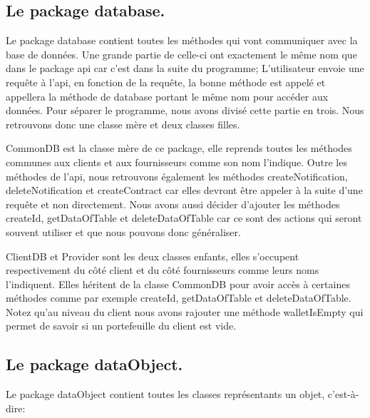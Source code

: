 \subsection{Le package database.}

\begin{flushleft}
Le package database contient toutes les méthodes qui vont communiquer avec la base de données. Une grande partie de celle-ci ont exactement le même nom que dans le package api car c'est dans la suite du programme; L'utilisateur envoie une requête à l'api, en fonction de la requête, la bonne méthode est appelé et appellera la méthode de database portant le même nom pour accéder aux données. Pour séparer le programme, nous avons divisé  cette partie en trois. Nous retrouvons donc une classe mère et deux classes filles.
\end{flushleft}

\begin{flushleft}
CommonDB est la classe mère de ce package, elle reprends toutes les méthodes communes aux clients et aux fournisseurs comme son nom l'indique. Outre les méthodes de l'api, nous retrouvons également les méthodes createNotification, deleteNotification et createContract car elles devront être appeler à la suite d'une requête et non directement. Nous avons aussi décider d'ajouter les méthodes createId, getDataOfTable et deleteDataOfTable car ce sont des actions qui seront souvent utiliser et que nous pouvons donc généraliser.
\end{flushleft}

\begin{flushleft}
ClientDB et Provider sont les deux classes enfants, elles s'occupent respectivement du côté client et du côté fournisseurs comme leurs noms l'indiquent. Elles héritent de la classe CommonDB pour avoir accès à certaines méthodes comme par exemple createId, getDataOfTable et deleteDataOfTable. Notez qu'au niveau du client nous avons rajouter une méthode walletIsEmpty qui permet de savoir si un portefeuille du client est vide.
\end{flushleft}

\subsection{Le package dataObject.}

\begin{flushleft}
Le package dataObject contient toutes les classes représentants un objet, c'est-à-dire:
\end{flushleft}

